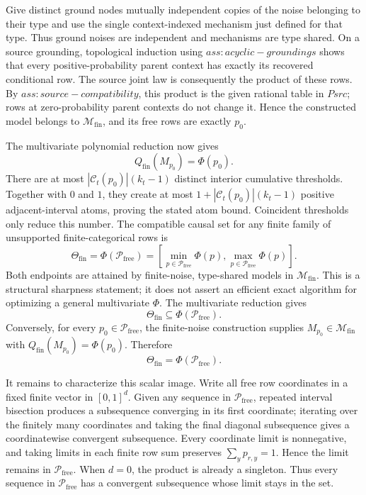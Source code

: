 Give distinct ground nodes mutually independent copies of the noise belonging to their type and use the single context-indexed mechanism just defined for that type.  Thus ground noises are independent and mechanisms are type shared.  On a source grounding, topological induction using \(ass:acyclic-groundings\) shows that every positive-probability parent context has exactly its recovered conditional row.  The source joint law is consequently the product of these rows.  By \(ass:source-compatibility\), this product is the given rational table in \(Psrc\); rows at zero-probability parent contexts do not change it.  Hence the constructed model belongs to \(\mathcal M_{\mathrm{fin}}\), and its free rows are exactly \(p_0\).

The multivariate polynomial reduction now gives
\[
 Q_{\mathrm{fin}}(M_{p_0})=\Phi(p_0).
\]
There are at most \(|\mathcal C_t(p_0)|(k_t-1)\) distinct interior cumulative thresholds.  Together with \(0\) and \(1\), they create at most \(1+|\mathcal C_t(p_0)|(k_t-1)\) positive adjacent-interval atoms, proving the stated atom bound.  Coincident thresholds only reduce this number.
The compatible causal set for any finite family of unsupported finite-categorical rows is
\[
 \Theta_{\mathrm{fin}}=\Phi(\mathcal P_{\mathrm{free}})
 =\left[\min_{p\in\mathcal P_{\mathrm{free}}}\Phi(p),
         \max_{p\in\mathcal P_{\mathrm{free}}}\Phi(p)\right].
\]
Both endpoints are attained by finite-noise, type-shared models in \(\mathcal M_{\mathrm{fin}}\).  This is a structural sharpness statement; it does not assert an efficient exact algorithm for optimizing a general multivariate \(\Phi\).
The multivariate reduction gives
\[
 \Theta_{\mathrm{fin}}\subseteq\Phi(\mathcal P_{\mathrm{free}}).
\]
Conversely, for every \(p_0\in\mathcal P_{\mathrm{free}}\), the finite-noise construction supplies \(M_{p_0}\in\mathcal M_{\mathrm{fin}}\) with \(Q_{\mathrm{fin}}(M_{p_0})=\Phi(p_0)\).  Therefore
\[
 \Theta_{\mathrm{fin}}=\Phi(\mathcal P_{\mathrm{free}}).
\]

It remains to characterize this scalar image.  Write all free row coordinates in a fixed finite vector in \([0,1]^d\).  Given any sequence in \(\mathcal P_{\mathrm{free}}\), repeated interval bisection produces a subsequence converging in its first coordinate; iterating over the finitely many coordinates and taking the final diagonal subsequence gives a coordinatewise convergent subsequence.  Every coordinate limit is nonnegative, and taking limits in each finite row sum preserves \(\sum_y p_{r,y}=1\).  Hence the limit remains in \(\mathcal P_{\mathrm{free}}\).  When \(d=0\), the product is already a singleton.  Thus every sequence in \(\mathcal P_{\mathrm{free}}\) has a convergent subsequence whose limit stays in the set.

